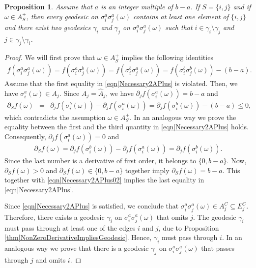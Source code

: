 \documentclass[reqno]{amsart}
\newtheorem{proposition}[theorem]{Proposition}
\begin{document}
\begin{proposition}\label{thm|Necessary2APlus} 
Assume that $a$ is an integer multiple of $b-a$. If $S=\{i,j\}$ and if $\omega\in A_S^+$, then every geodesic on $\sigma_i^a\sigma_j^a(\omega)$ contains at least one element of $\{i,j\}$ and there exist two geodesics $\gamma_i$ and $\gamma_j$ on $\sigma_i^a\sigma_j^a(\omega)$ such that $i\in \gamma_i\setminus \gamma_j$ and $j\in \gamma_j\setminus\gamma_i$.
\end{proposition}
\begin{proof} We will first prove that $\omega\in A_S^+$ implies the following identities 
\begin{eqnarray}
f\left(\sigma_i^a\sigma_j^a(\omega)\right)= f\left(\sigma_i^a\sigma_j^b(\omega)\right) = f\left(\sigma_i^b\sigma_j^a(\omega)\right) = f\left(\sigma_i^b\sigma_j^b(\omega)\right)-(b-a). \label{eqn|Necessary2APlus}
\end{eqnarray}
Assume that the first equality in \eqref{eqn|Necessary2APlus} is violated. Then, we have $\sigma_i^a(\omega)\in A_j$. Since $A_j=\hat A_j$, we have $\partial_jf\left(\sigma_i^a(\omega)\right)=b-a$ and 
\begin{eqnarray*} \partial_Sf(\omega)&=&\partial_jf\left(\sigma_i^b(\omega)\right)- \partial_jf\left(\sigma_i^a(\omega)\right) =\partial_jf\left(\sigma_i^b(\omega)\right)- (b-a)\leq 0,
\end{eqnarray*} which contradicts the assumption $\omega\in A_S^+$.
In an analogous way we prove the equality between the first and the third quantity in \eqref{eqn|Necessary2APlus} holds. Consequently, $\partial_jf\left(\sigma_i^a(\omega)\right)=0$ and 
\begin{eqnarray}\partial_Sf(\omega)=\partial_jf\left(\sigma_i^b(\omega)\right)-\partial_jf\left(\sigma_i^a(\omega)\right)=
\partial_jf\left(\sigma_i^b(\omega)\right). \label{eqn|Necessary2APlus02}
\end{eqnarray}
Since the last number is a derivative of first order, it belongs to $\{0,b-a\}$. Now, $\partial_Sf(\omega)>0$ and $\partial_Sf(\omega)\in\{0,b-a\}$ together imply $\partial_Sf(\omega)=b-a$. This together with \eqref{eqn|Necessary2APlus02} implies the last equality in \eqref{eqn|Necessary2APlus}.

Since \eqref{eqn|Necessary2APlus} is satisfied, we conclude that $\sigma_i^a\sigma_j^a(\omega)\in A_j^C\subseteq E_j^C$. Therefore, there exists a geodesic $\gamma_i$ on $\sigma_i^a\sigma_j^a(\omega)$ that omits $j$. The geodesic $\gamma_i$ must pass through at least one of the edges $i$ and $j$, due to Proposition \ref{thm|NonZeroDerivativeImpliesGeodesic}. Hence, $\gamma_i$ must pass through $i$. In an analogous way we prove that there is a geodesic $\gamma_j$ on $\sigma_i^a\sigma_j^a(\omega)$ that passes through $j$ and omits $i$.
\end{proof}
\end{document}
